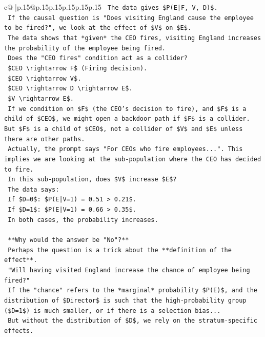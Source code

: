 \documentclass{article}
\begin{document}
{\begin{supertabular}{c@{$\;$}|p{.15\linewidth}@{}p{.15\linewidth}p{.15\linewidth}p{.15\linewidth}p{.15\linewidth}p{.15\linewidth}}
{{{\texttt{    The data gives \$P(E|F, V, D)\$.} \\
\texttt{    If the causal question is "Does visiting England cause the employee to be fired?", we look at the effect of \$V\$ on \$E\$.} \\
\texttt{    The data shows that *given* the CEO fires, visiting England increases the probability of the employee being fired.} \\
\texttt{    Does the "CEO fires" condition act as a collider?} \\
\texttt{    \$CEO \textbackslash{}rightarrow F\$ (Firing decision).} \\
\texttt{    \$CEO \textbackslash{}rightarrow V\$.} \\
\texttt{    \$CEO \textbackslash{}rightarrow D \textbackslash{}rightarrow E\$.} \\
\texttt{    \$V \textbackslash{}rightarrow E\$.} \\
\texttt{    If we condition on \$F\$ (the CEO's decision to fire), and \$F\$ is a child of \$CEO\$, we might open a backdoor path if \$F\$ is a collider. But \$F\$ is a child of \$CEO\$, not a collider of \$V\$ and \$E\$ unless there are other paths.} \\
\texttt{    Actually, the prompt says "For CEOs who fire employees...". This implies we are looking at the sub{-}population where the CEO has decided to fire.} \\
\texttt{    In this sub{-}population, does \$V\$ increase \$E\$?} \\
\texttt{    The data says:} \\
\texttt{    If \$D=0\$: \$P(E|V=1) = 0.51 > 0.21\$.} \\
\texttt{    If \$D=1\$: \$P(E|V=1) = 0.66 > 0.35\$.} \\
\texttt{    In both cases, the probability increases.} \\
\\ 
\texttt{    **Why would the answer be "No"?**} \\
\texttt{    Perhaps the question is a trick about the **definition of the effect**.} \\
\texttt{    "Will having visited England increase the chance of employee being fired?"} \\
\texttt{    If the "chance" refers to the *marginal* probability \$P(E)\$, and the distribution of \$Director\$ is such that the high{-}probability group (\$D=1\$) is much smaller, or if there is a selection bias...} \\
\texttt{    But without the distribution of \$D\$, we rely on the stratum{-}specific effects.} \\
}}}
\end{supertabular}}
\end{document}
